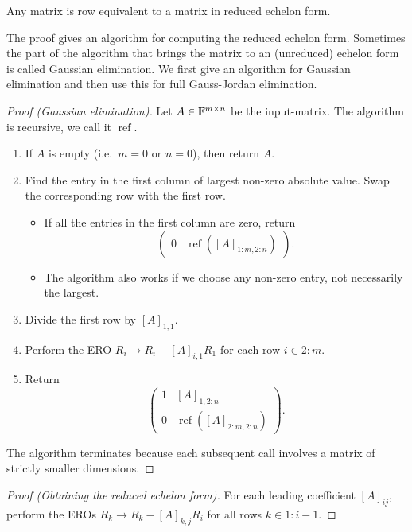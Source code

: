 \begin{proposition}
Any matrix is row equivalent to a matrix in reduced echelon form.
\end{proposition}
The proof gives an algorithm for computing the reduced echelon form. Sometimes the part of the algorithm that brings the matrix to an (unreduced) echelon form is called Gaussian elimination. We first give an algorithm for Gaussian elimination and then use this for full Gauss-Jordan elimination.
\begin{proof}[Proof (Gaussian elimination)]
Let $A\in\mathbb{F}^{m\times n}$ be the input-matrix. The algorithm is recursive, we call it $\operatorname{ref}$.
\begin{enumerate}
\item If $A$ is empty (i.e.\ $m=0$ or $n=0$), then return $A$.
\item Find the entry in the first column of largest non-zero absolute value. Swap the corresponding row with the first row.
\begin{itemize}
\item If all the entries in the first column are zero, return
\[ \begin{pmatrix}
0 & \operatorname{ref}\left([A]_{1:m,2:n}\right)
\end{pmatrix}. \]
\item The algorithm also works if we choose any non-zero entry, not necessarily the largest.
\end{itemize}
\item Divide the first row by $[A]_{1,1}$.
\item Perform the ERO $R_i\to R_i - [A]_{i,1}R_1$ for each row $i\in 2:m$.
\item Return
\[ \begin{pmatrix}
1 & [A]_{1,2:n} \\
0 & \operatorname{ref}\left([A]_{2:m,2:n}\right)
\end{pmatrix}. \]
\end{enumerate}
The algorithm terminates because each subsequent call involves a matrix of strictly smaller dimensions.
\end{proof}
\begin{proof}[Proof (Obtaining the reduced echelon form)]
For each leading coefficient $[A]_{ij}$, perform the EROs $R_k\to R_k-[A]_{k,j}R_i$ for all rows $k\in 1:i-1$.
\end{proof}

